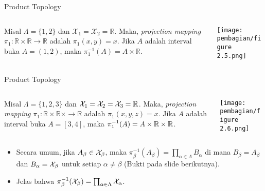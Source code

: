     \begin{frame}{Product Topology}
    \begin{columns}
        \begin{column}{0.7\textwidth}
        \begin{tcolorbox}[enhanced,title=Contoh,frame style tile = {width=\paperwidth}{wallpaper}]
            Misal $\Lambda = \{1,2\}$ dan $\mathcal{X}_1 = \mathcal{X}_2 = \mathbb{R}$. Maka, \textit{projection mapping} $\pi_1 : \mathbb{R}\times\mathbb{R}\to\mathbb{R}$ adalah $\pi_1(x,y) = x$. Jika $A$ adalah interval buka $A = (1,2)$, maka $\pi_1^{-1}(A) = A\times\mathbb{R}$.
        \end{tcolorbox}
        \end{column}
        \begin{column}{0.3\textwidth}
            \texttt{[image: pembagian/figure 2.5.png]}
        \end{column}
    \end{columns}
    \end{frame}
    
    \begin{frame}{Product Topology}
    \begin{columns}
        \begin{column}{0.7\textwidth}
        \begin{tcolorbox}[enhanced, title=Contoh, frame style tile = {width=\paperwidth}{wallpaper}]
            Misal $\Lambda = \{1,2,3\}$ dan $\mathcal{X}_1 = \mathcal{X}_2 = \mathcal{X}_3 = \mathbb{R}$. Maka, \textit{projection mapping} $\pi_1 : \mathbb{R}\times\mathbb{R}\times\to\mathbb{R}$ adalah $\pi_1(x,y,z) = x$. Jika $A$ adalah interval buka $A = [3,4]$, maka $\pi_1^{-1}(A) = A\times\mathbb{R}\times\mathbb{R}$.
        \end{tcolorbox}
        \end{column}
        \begin{column}{0.3\textwidth}
            \texttt{[image: pembagian/figure 2.6.png]}
        \end{column}
    \end{columns}
    \begin{itemize}
            \item Secara umum, jika $A_\beta\in\mathcal{X}_\beta$, maka $\pi_\beta^{-1}(A_\beta) = \prod_{\alpha\in\Lambda} B_\alpha$ di mana $B_\beta = A_\beta$ dan $B_\alpha = \mathcal{X}_\beta$ untuk setiap $\alpha\neq\beta$ (Bukti pada slide berikutnya).
            \item Jelas bahwa $\pi_\beta^{-1}(\mathcal{X}_\beta) = \prod_{\alpha\in\Lambda} \mathcal{X}_\alpha$.
        \end{itemize} 
    \end{frame}
    
